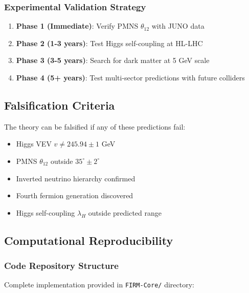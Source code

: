 \documentclass[12pt,a4paper]{article}
\begin{document}
\subsubsection{Experimental Validation Strategy}
\begin{enumerate}
\item \textbf{Phase 1 (Immediate)}: Verify PMNS $\theta_{12}$ with JUNO data
\item \textbf{Phase 2 (1-3 years)}: Test Higgs self-coupling at HL-LHC
\item \textbf{Phase 3 (3-5 years)}: Search for dark matter at 5 GeV scale
\item \textbf{Phase 4 (5+ years)}: Test multi-sector predictions with future colliders
\end{enumerate}

\subsection{Falsification Criteria}

The theory can be falsified if any of these predictions fail:

\begin{itemize}
\item Higgs VEV $v \neq 245.94 \pm 1$ GeV
\item PMNS $\theta_{12}$ outside $35^\circ \pm 2^\circ$
\item Inverted neutrino hierarchy confirmed
\item Fourth fermion generation discovered
\item Higgs self-coupling $\lambda_H$ outside predicted range
\end{itemize}

\subsection{Computational Reproducibility}

\subsubsection{Code Repository Structure}

Complete implementation provided in \texttt{FIRM-Core/} directory:
\end{document}

